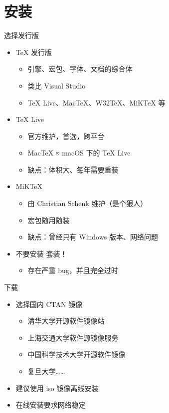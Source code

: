 \section{安装}

\begin{frame}{选择发行版}
\begin{itemize}
  \item \TeX{} 发行版
    \begin{itemize}
      \item 引擎、宏包、字体、文档的综合体
      \item 类比 Visual Studio
      \item \TeX{} Live、Mac\TeX{}、W32\TeX{}、MiK\TeX{} 等
    \end{itemize} \pause
  \item \TeX{} Live 
    \begin{itemize}
      \item 官方维护，首选，跨平台
      \item Mac\TeX{} ≈ macOS 下的 \TeX{} Live
      \item 缺点：体积大、每年需要重装
    \end{itemize}
  \item MiK\TeX{} 
    \begin{itemize}
      \item 由 Christian Schenk 维护（是个狠人）
      \item 宏包随用随装
      \item 缺点：曾经只有 Windows 版本、网络问题
    \end{itemize} \pause
  \item \alert{不要安装 \CTeX{} 套装！}
    \begin{itemize}
      \item \alert{存在严重 bug，并且完全过时}
    \end{itemize}
\end{itemize}
\end{frame}

\begin{frame}{下载}
\begin{itemize}
  \item 选择国内 CTAN 镜像
    \begin{itemize}
      \item 清华大学开源软件镜像站 
      \item 上海交通大学软件源镜像服务 
      \item 中国科学技术大学开源软件镜像  \pause
      \item 复旦大学……
    \end{itemize} \pause
  \item 建议使用 iso 镜像离线安装
  \item 在线安装要求网络稳定
\end{itemize}
\end{frame}

